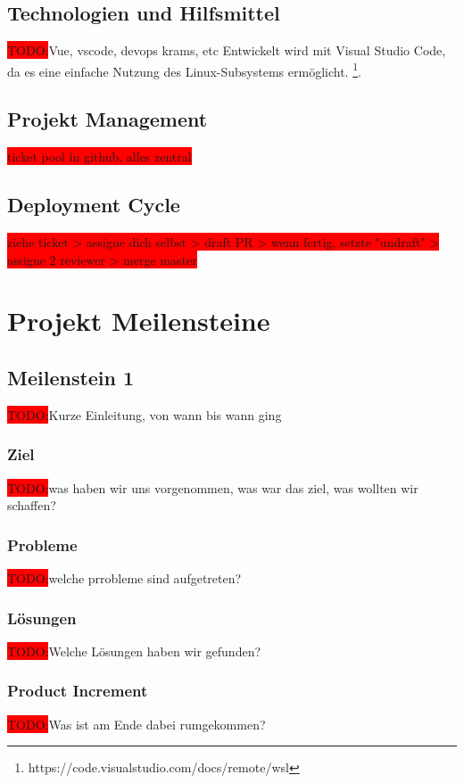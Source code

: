 \documentclass[10pt, a4paper]{article}
\begin{document}
\subsection{Technologien und Hilfsmittel}
\colorbox{red}{TODO:}Vue, vscode, devops krams, etc
Entwickelt wird mit Visual Studio Code, da es eine einfache Nutzung des Linux-Subsystems ermöglicht. \footnote{https://code.visualstudio.com/docs/remote/wsl}.

\subsection{Projekt Management}
\colorbox{red}{ticket pool in github, alles zentral}

\subsection{Deployment Cycle}
\colorbox{red}{ziehe ticket > assigne dich selbst > draft PR > wenn fertig, setzte "undraft" > assigne 2 reviewer > merge master}

\section{Projekt Meilensteine}
\subsection{Meilenstein 1}
\colorbox{red}{TODO:}Kurze Einleitung, von wann bis wann ging
\subsubsection{Ziel}
\colorbox{red}{TODO:}was haben wir uns vorgenommen, was war das ziel, was wollten wir schaffen?
\subsubsection{Probleme}
\colorbox{red}{TODO:}welche prrobleme sind aufgetreten?

\subsubsection{Lösungen}
\colorbox{red}{TODO:}Welche Lösungen haben wir gefunden?

\subsubsection{Product Increment}
\colorbox{red}{TODO:}Was ist am Ende dabei rumgekommen?
\end{document}
